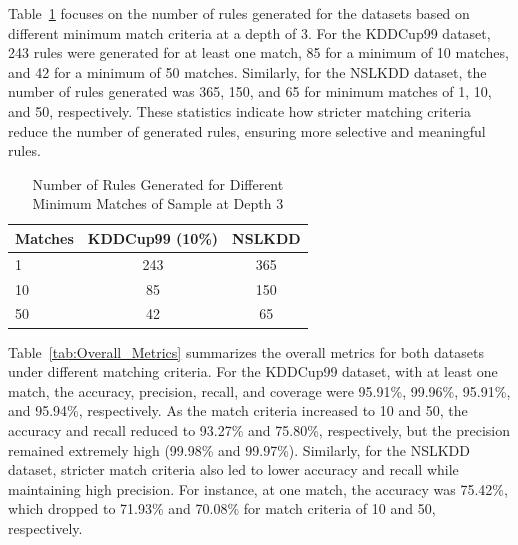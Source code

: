 \documentclass[pdflatex,sn-mathphys-num]{sn-jnl}%
\let\oldcaption\caption
\renewcommand{\caption}[1]{\oldcaption{\centering #1}}
\theoremstyle{thmstyleone}%
\theoremstyle{thmstyletwo}%
\theoremstyle{thmstylethree}%
\begin{document}
Table~\ref{tab:Rules_Generated} focuses on the number of rules generated for the datasets based on different minimum match criteria at a depth of 3.
For the KDDCup99 dataset, 243 rules were generated for at least one match, 85 for a minimum of 10 matches, and 42 for a minimum of 50 matches.
Similarly, for the NSLKDD dataset, the number of rules generated was 365, 150, and 65 for minimum matches of 1, 10, and 50, respectively.
These statistics indicate how stricter matching criteria reduce the number of generated rules, ensuring more selective and meaningful rules.

\begin{table}[ht!]
  \centering
  \caption{Number of Rules Generated for Different Minimum Matches of Sample at Depth 3}
  \label{tab:Rules_Generated}
  \begin{tabular}{lcc}
    \hline
    \textbf{Matches} & \textbf{KDDCup99 (10\%)} & \textbf{NSLKDD} \\ \hline
    1                & 243                      & 365             \\
    10               & 85                       & 150             \\
    50               & 42                       & 65              \\ \hline
  \end{tabular}
\end{table}


Table~\ref{tab:Overall_Metrics} summarizes the overall metrics for both datasets under different matching criteria.
For the KDDCup99 dataset, with at least one match, the accuracy, precision, recall, and coverage were 95.91\%, 99.96\%, 95.91\%, and 95.94\%, respectively. As the match criteria increased to 10 and 50, the accuracy and recall reduced to 93.27\% and 75.80\%, respectively, but the precision remained extremely high (99.98\% and 99.97\%). Similarly, for the NSLKDD dataset, stricter match criteria also led to lower accuracy and recall while maintaining high precision. For instance, at one match, the accuracy was 75.42\%, which dropped to 71.93\% and 70.08\% for match criteria of 10 and 50, respectively.
\end{document}
